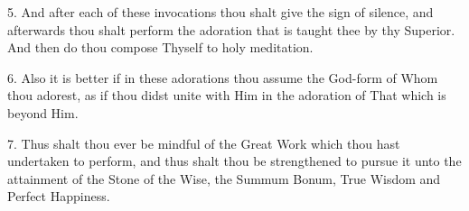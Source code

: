 5. And after each of these invocations thou shalt give the sign of silence, and afterwards thou shalt perform the adoration that is taught thee by thy Superior. And then do thou compose Thyself to holy meditation.

6. Also it is better if in these adorations thou assume the God-form of Whom thou adorest, as if thou didst unite with Him in the adoration of That which is beyond Him.

7. Thus shalt thou ever be mindful of the Great Work which thou hast undertaken to perform, and thus shalt thou be strengthened to pursue it unto the attainment of the Stone of the Wise, the Summum Bonum, True Wisdom and Perfect Happiness.
